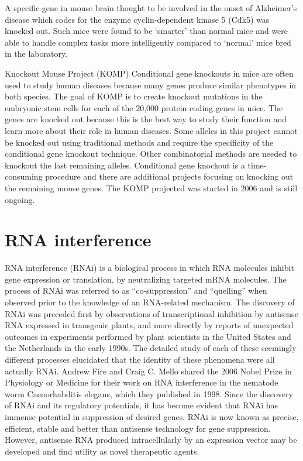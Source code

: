 A specific gene in mouse brain thought to be involved in the onset of Alzheimer's disease which codes for the enzyme cyclin-dependent kinase 5 (Cdk5) was knocked out. Such mice were found to be `smarter' than normal mice and were able to handle complex tasks more intelligently compared to `normal' mice bred in the laboratory.

Knockout Mouse Project (KOMP)
Conditional gene knockouts in mice are often used to study human diseases because many genes produce similar phenotypes in both species. The goal of KOMP is to create knockout mutations in the embryonic stem cells for each of the 20,000 protein coding genes in mice. The genes are knocked out because this is the best way to study their function and learn more about their role in human diseases. Some alleles in this project cannot be knocked out using traditional methods and require the specificity of the conditional gene knockout technique. Other combinatorial methods are needed to knockout the last remaining alleles. Conditional gene knockout is a time-consuming procedure and there are additional projects focusing on knocking out the remaining mouse genes. The KOMP projected was started in 2006 and is still ongoing.

\hypertarget{rna-interference}{%
\section{RNA interference}\label{rna-interference}}

RNA interference (RNAi) is a biological process in which RNA molecules inhibit gene expression or translation, by neutralizing targeted mRNA molecules. The process of RNAi was referred to as ``co-suppression'' and ``quelling'' when observed prior to the knowledge of an RNA-related mechanism. The discovery of RNAi was preceded first by observations of transcriptional inhibition by antisense RNA expressed in transgenic plants, and more directly by reports of unexpected outcomes in experiments performed by plant scientists in the United States and the Netherlands in the early 1990s. The detailed study of each of these seemingly different processes elucidated that the identity of these phenomena were all actually RNAi. Andrew Fire and Craig C. Mello shared the 2006 Nobel Prize in Physiology or Medicine for their work on RNA interference in the nematode worm Caenorhabditis elegans, which they published in 1998. Since the discovery of RNAi and its regulatory potentials, it has become evident that RNAi has immense potential in suppression of desired genes. RNAi is now known as precise, efficient, stable and better than antisense technology for gene suppression. However, antisense RNA produced intracellularly by an expression vector may be developed and find utility as novel therapeutic agents.

